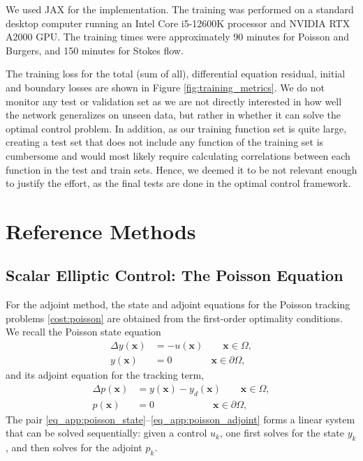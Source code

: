 \documentclass[final,1p,times]{elsarticle}
\theoremstyle{plain} %
\theoremstyle{definition} %
\theoremstyle{remark} %
\begin{document}
We used JAX \cite{jax2018github} for the implementation. The training was performed on a standard desktop computer running an Intel Core i5-12600K processor and NVIDIA RTX A2000 GPU. The training times were approximately 90 minutes for Poisson and Burgers,  and 150 minutes for Stokes flow.

The training loss for the total (sum of all), differential equation residual, initial and boundary losses are shown in Figure \ref{fig:training_metrics}. We do not monitor any test or validation set as we are not directly interested in how well the network generalizes on unseen data, but rather in whether it can solve the optimal control problem. In addition, as our training function set is quite large, creating a test set that does not include any function of the training set is cumbersome and would most likely require calculating correlations between each function in the test and train sets. Hence, we deemed it to be not relevant enough to justify the effort, as the final tests are done in the optimal control framework.   

\clearpage

\section{Reference Methods}\label{appendix_b}
\subsection{Scalar Elliptic Control: The Poisson Equation}

For the adjoint method, the state and adjoint equations for the Poisson tracking problems \eqref{cost:poisson} are obtained from the first-order optimality conditions. We recall the Poisson state equation
\begin{equation}\label{eq_app:poisson_state}
\begin{aligned}
\Delta y(\mathbf{x}) &= -u(\mathbf{x}) \qquad \mathbf{x\in} \Omega,\\
y(\mathbf{x}) &= 0 \qquad \qquad \mathbf{x} \in \partial\Omega,
\end{aligned}
\end{equation}
and its adjoint equation for the tracking term,
\begin{equation}\label{eq_app:poisson_adjoint}
\begin{aligned}
\Delta p(\mathbf{x}) &= y(\mathbf{x}) - y_d(\mathbf{x}) \qquad \mathbf{x\in} \Omega,\\
p(\mathbf{x}) &= 0 \qquad \qquad \qquad \mathbf{x} \in \partial\Omega,
\end{aligned}
\end{equation}
The pair \eqref{eq_app:poisson_state}--\eqref{eq_app:poisson_adjoint} forms a linear system that can be solved sequentially: given a control $u_k$, one first solves for the state $y_k$, and then solves for the adjoint $p_k$.
\end{document}

